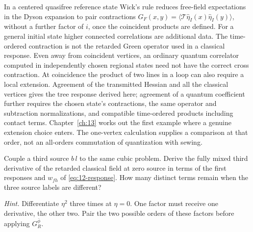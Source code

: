 In a centered quasifree reference state Wick's rule reduces free-field
expectations in the Dyson expansion to pair contractions
$G_F(x,y)=\langle\mathcal T\widehat\eta_I(x)\widehat\eta_I(y)\rangle$,
without a further factor of $i$, once the coincident products are defined.
For a general initial state higher connected correlations are additional
data. The time-ordered contraction is not the retarded Green operator used
in a classical response. Even away from coincident vertices, an ordinary
quantum correlator computed in independently chosen regional states need
not have the correct cross contraction. At coincidence the product of two
lines in a loop can also require a local extension. Agreement of the
transmitted Hessian and all the classical vertices gives the tree response
derived here; agreement of a quantum coefficient further requires the
chosen state's contractions, the same operator and subtraction
normalizations, and compatible time-ordered products including contact
terms. Chapter~\ref{ch:13} works out the first example where a genuine
extension choice enters. The one-vertex calculation supplies a comparison
at that order, not an all-orders commutation of quantization with sewing.

\begin{exercise}
Couple a third source $b\,l$ to the same cubic problem. Derive the fully
mixed third derivative of the retarded classical field at zero source in
terms of the first responses and $w_{fh}$ of \eqref{eq:12-response}. How
many distinct terms remain when the three source labels are different?
\end{exercise}
\noindent\emph{Hint.} Differentiate $\eta^2$ three times at $\eta=0$.
One factor must receive one derivative, the other two. Pair the two possible
orders of these factors before applying $G_R^{\bar\phi}$.

